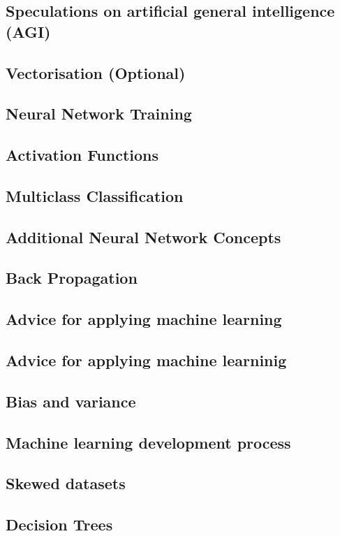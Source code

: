 \documentclass[a4paper, 11pt]{book}
\begin{document}
    \subsection{Speculations on artificial general intelligence (AGI)}
    \subsection{Vectorisation (Optional)}
    \subsection{Neural Network Training}
    \subsection{Activation Functions}
    \subsection{Multiclass Classification}
    \subsection{Additional Neural Network Concepts}
    \subsection{Back Propagation}
    \subsection{Advice for applying machine learning}
    \subsection{Advice for applying machine learninig}
    \subsection{Bias and variance}
    \subsection{Machine learning development process}
    \subsection{Skewed datasets}
    \subsection{Decision Trees}
\end{document}

